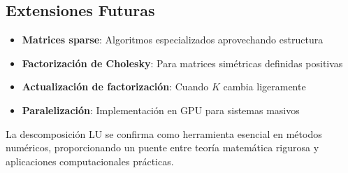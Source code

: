 \documentclass[12pt,a4paper]{article}
\begin{document}
\subsection{Extensiones Futuras}

\begin{itemize}
\item \textbf{Matrices sparse}: Algoritmos especializados aprovechando estructura
\item \textbf{Factorización de Cholesky}: Para matrices simétricas definidas positivas
\item \textbf{Actualización de factorización}: Cuando \(K\) cambia ligeramente
\item \textbf{Paralelización}: Implementación en GPU para sistemas masivos
\end{itemize}

La descomposición LU se confirma como herramienta esencial en métodos numéricos, proporcionando un puente entre teoría matemática rigurosa y aplicaciones computacionales prácticas.
\end{document}
